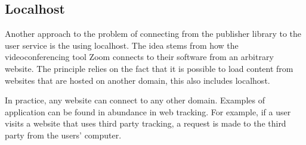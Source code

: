 \subsection{Localhost}

Another approach to the problem of connecting from the publisher library to the user service is the using localhost. The idea stems from how the videoconferencing tool Zoom connects to their software from an arbitrary website. The principle relies on the fact that it is possible to load content from websites that are hosted on another domain, this also includes localhost.

In practice, any website can connect to any other domain. Examples of application can be found in abundance in web tracking. For example, if a user visits a website that uses third party tracking, a request is made to the third party from the users' computer. 




